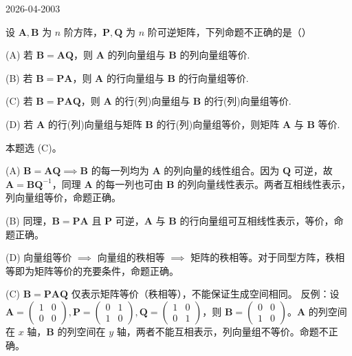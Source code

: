 \begin{mistake}{2026-04-20}{03}

\begin{problemcontent}
设 \(\mathbf{A}, \mathbf{B}\) 为 \(n\) 阶方阵，\(\mathbf{P}, \mathbf{Q}\) 为 \(n\) 阶可逆矩阵，下列命题不正确的是（\quad）

(A) 若 \(\mathbf{B} = \mathbf{A}\mathbf{Q}\)，则 \(\mathbf{A}\) 的列向量组与 \(\mathbf{B}\) 的列向量组等价.

(B) 若 \(\mathbf{B} = \mathbf{P}\mathbf{A}\)，则 \(\mathbf{A}\) 的行向量组与 \(\mathbf{B}\) 的行向量组等价.

(C) 若 \(\mathbf{B} = \mathbf{P}\mathbf{A}\mathbf{Q}\)，则 \(\mathbf{A}\) 的行(列)向量组与 \(\mathbf{B}\) 的行(列)向量组等价.

(D) 若 \(\mathbf{A}\) 的行(列)向量组与矩阵 \(\mathbf{B}\) 的行(列)向量组等价，则矩阵 \(\mathbf{A}\) 与 \(\mathbf{B}\) 等价.
\end{problemcontent}

\begin{solutioncontent}
本题选 (C)。

(A) \(\mathbf{B} = \mathbf{A}\mathbf{Q} \implies \mathbf{B}\) 的每一列均为 \(\mathbf{A}\) 的列向量的线性组合。因为 \(\mathbf{Q}\) 可逆，故 \(\mathbf{A} = \mathbf{B}\mathbf{Q}^{-1}\)，同理 \(\mathbf{A}\) 的每一列也可由 \(\mathbf{B}\) 的列向量线性表示。两者互相线性表示，列向量组等价，命题正确。

(B) 同理，\(\mathbf{B} = \mathbf{P}\mathbf{A}\) 且 \(\mathbf{P}\) 可逆，\(\mathbf{A}\) 与 \(\mathbf{B}\) 的行向量组可互相线性表示，等价，命题正确。

(D) 向量组等价 \(\implies\) 向量组的秩相等 \(\implies\) 矩阵的秩相等。对于同型方阵，秩相等即为矩阵等价的充要条件，命题正确。

(C) \(\mathbf{B} = \mathbf{P}\mathbf{A}\mathbf{Q}\) 仅表示矩阵等价（秩相等），不能保证生成空间相同。
反例：设 \(\mathbf{A}=\begin{pmatrix} 1 & 0 \\ 0 & 0 \end{pmatrix}, \mathbf{P}=\begin{pmatrix} 0 & 1 \\ 1 & 0 \end{pmatrix}, \mathbf{Q}=\begin{pmatrix} 1 & 0 \\ 0 & 1 \end{pmatrix}\)，则 \(\mathbf{B}=\begin{pmatrix} 0 & 0 \\ 1 & 0 \end{pmatrix}\)。\(\mathbf{A}\) 的列空间在 \(x\) 轴，\(\mathbf{B}\) 的列空间在 \(y\) 轴，两者不能互相表示，列向量组不等价。命题不正确。
\end{solutioncontent}


\end{mistake}
